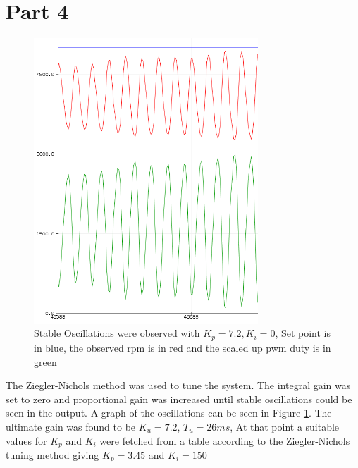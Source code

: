 \documentclass{article}
\begin{document}
\section{Part 4}



\begin{figure}[H]
    \centering
    \includegraphics[width=0.75\textwidth]{Project3ControllerStateMachine/oscillate_p72.png}
    \caption{Stable Oscillations were observed with \(K_p = 7.2, K_i=0\), Set point is in blue, the observed rpm is in red and the scaled up pwm duty is in green}
    \label{fig:oscillations}
\end{figure}

The Ziegler-Nichols method was used to tune the system. The integral gain was set to zero and proportional gain was increased until stable  oscillations could be seen in the output. A graph of the oscillations can be seen in Figure \ref{fig:oscillations}. The ultimate gain was found to be \(K_u = 7.2\), \(T_u = 26 ms\), At that point a suitable values for \(K_p\) and \(K_i\) were fetched from a table according to the Ziegler-Nichols tuning method giving \(K_p=3.45\) and  \(K_i=150\)
\\
\end{document}

